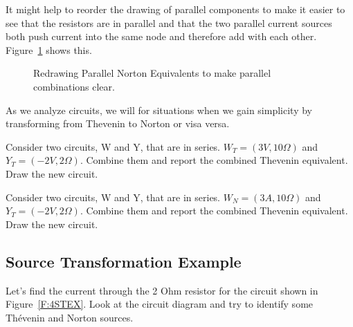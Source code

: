 It might help to reorder the drawing of parallel components to make it easier to see that the resistors are in parallel and that the two parallel current sources both push current into the same node and therefore add with each other. Figure~\ref{F:4STCOM} shows this. \\

\begin{figure}[H]
\begin{center}
\caption{Redrawing Parallel Norton Equivalents to make parallel combinations clear.}
\label{F:4STCOM}
\end{center}
\end{figure}

As we analyze circuits, we will for situations when we gain simplicity by transforming from Thevenin to Norton or visa versa.

\begin{blevel}
Consider two circuits, W and Y, that are in series. $W_T=(3V,10\Omega)$ and $Y_T=(-2V,2\Omega)$. Combine them and report the combined Thevenin equivalent. Draw the new circuit.
\end{blevel}

\begin{clevel}
Consider two circuits, W and Y, that are in series. $W_N=(3A,10\Omega)$ and $Y_T=(-2V,2\Omega)$. Combine them and report the combined Thevenin equivalent. Draw the new circuit.
\end{clevel}

\subsection{Source Transformation Example}
Let's find the current through the 2 Ohm resistor for the circuit shown in Figure~\ref{F:4STEX}. Look at the circuit diagram and try to identify some Th\'{e}venin and Norton sources.

